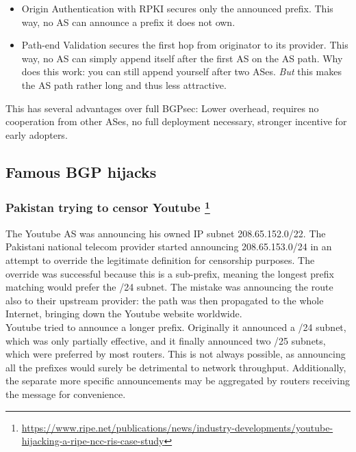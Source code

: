 \documentclass[11pt,oneside,a4paper]{article}
\begin{document}
\vspace{-\topsep}
\begin{itemize}
	\setlength{\itemsep}{0pt}
	\setlength{\parskip}{0pt}
	\item Origin Authentication with RPKI secures only the announced prefix. This way, no AS can announce a prefix it does not own.
	\item Path-end Validation secures the first hop	from originator to its provider. This way, no AS can simply append itself after the first AS on the AS path. Why does this work: you can still append yourself after two ASes. \textit{But} this makes the AS path rather long and thus less attractive.
\end{itemize}
\vspace{-\topsep}

\noindent This has several advantages over full BGPsec: Lower overhead, requires no cooperation from other ASes, no full deployment necessary, stronger incentive for early adopters.

\newpage

\subsection{Famous BGP hijacks}

\subsubsection[Pakistan trying to censor Youtube]{Pakistan trying to censor Youtube \footnote{\href{https://www.ripe.net/publications/news/industry-developments/youtube-hijacking-a-ripe-ncc-ris-case-study}{https://www.ripe.net/publications/news/industry-developments/youtube-hijacking-a-ripe-ncc-ris-case-study}}}

The Youtube AS was announcing his owned IP subnet 208.65.152.0/22. The Pakistani national telecom provider started announcing 208.65.153.0/24 in an attempt to override the legitimate definition for censorship purposes. The override was successful because this is a sub-prefix, meaning the longest prefix matching would prefer the /24 subnet. The mistake was announcing the route also to their upstream provider: the path was then propagated to the whole Internet, bringing down the Youtube website worldwide.\\
Youtube tried to announce a longer prefix. Originally it announced a /24 subnet, which was only partially effective, and it finally announced two /25 subnets, which were preferred by most routers. This is not always possible, as announcing all the prefixes would surely be detrimental to network throughput. Additionally, the separate more specific announcements may be aggregated by routers receiving the message for convenience.
\end{document}

